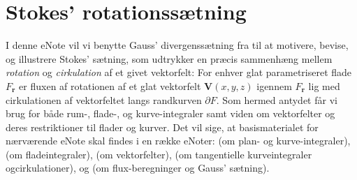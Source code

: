 

\setcounter{chapter}{26} %


%
%
%
%
%
%


\chapter{Stokes' rotationssætning} \label{tn27}


\begin{basis}
I denne eNote vil vi benytte Gauss' divergenssætning fra  til  at motivere, bevise, og illustrere Stokes' sætning, som udtrykker en præcis sammenhæng mellem \emph{rotation} og \emph{cirkulation} af et givet vektorfelt: For enhver glat parametriseret flade $F_{\mathbf{r}}$ er fluxen af rotationen af et glat vektorfelt $\mathbf{V}(x,y,z)$ igennem $F_{\mathbf{r}}$ lig med cirkulationen af vektorfeltet langs randkurven $\partial F$. Som hermed antydet får vi brug for både rum-, flade-, og kurve-integraler samt viden om vektorfelter og deres restriktioner til flader og kurver. Det vil sige, at basismaterialet for nærværende eNote skal findes i en række eNoter:  (om plan- og kurve-integraler),  (om fladeintegraler),  (om vektorfelter),  (om tangentielle kurveintegraler ogcirkulationer), og  (om flux-beregninger og Gauss' sætning).
\end{basis}


